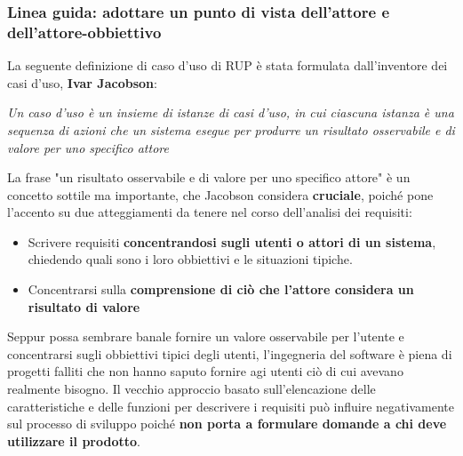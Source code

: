 \documentclass[12pt]{article}
\begin{document}
\subsubsection{Linea guida: adottare un punto di vista dell'attore e dell'attore-obbiettivo}
La seguente definizione di caso d'uso di RUP è stata formulata dall'inventore dei casi d'uso, \textbf{Ivar Jacobson}:
\begin{center}
    \textit{Un caso d'uso è un insieme di istanze di casi d'uso, in cui ciascuna istanza è una sequenza di azioni che un sistema esegue per produrre un risultato osservabile e di valore per uno specifico attore}
\end{center}
La frase "un risultato osservabile e di valore per uno specifico attore" è un concetto sottile ma importante, che Jacobson considera \textbf{cruciale}, poiché pone l'accento su due atteggiamenti da tenere nel corso dell'analisi dei requisiti:
\begin{itemize}
    \item Scrivere requisiti \textbf{concentrandosi sugli utenti o attori di un sistema}, chiedendo quali sono i loro obbiettivi e le situazioni tipiche.
    \item Concentrarsi sulla \textbf{comprensione di ciò che l'attore considera un risultato di valore} 
\end{itemize}
Seppur possa sembrare banale fornire un valore osservabile per l'utente e concentrarsi sugli obbiettivi tipici degli utenti, l'ingegneria del software è piena di progetti falliti che non hanno saputo fornire agi utenti ciò di cui avevano realmente bisogno.
Il vecchio approccio basato sull'elencazione delle caratteristiche e delle funzioni per descrivere i requisiti può influire negativamente sul processo di sviluppo poiché \textbf{non porta a formulare domande a chi deve utilizzare il prodotto}.
\end{document}
